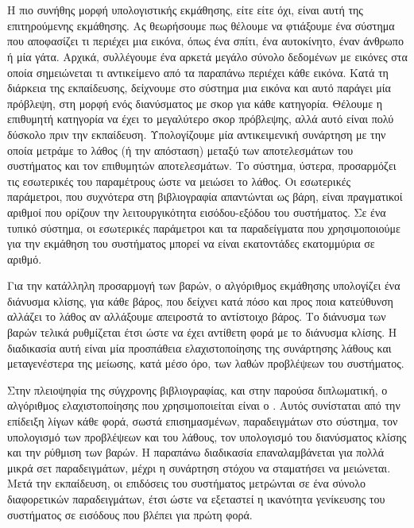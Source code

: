 \section{}

Η πιο συνήθης μορφή υπολογιστικής εκμάθησης, είτε  είτε όχι, είναι αυτή της επιτηρούμενης εκμάθησης. Ας θεωρήσουμε πως θέλουμε να φτιάξουμε ένα σύστημα που αποφασίζει τι περιέχει μια εικόνα, όπως ένα σπίτι, ένα αυτοκίνητο, έναν άνθρωπο ή μία γάτα. Αρχικά, συλλέγουμε ένα αρκετά μεγάλο σύνολο δεδομένων με εικόνες στα οποία σημειώνεται τι αντικείμενο από τα παραπάνω περιέχει κάθε εικόνα. Κατά τη διάρκεια της εκπαίδευσης, δείχνουμε στο σύστημα μια εικόνα και αυτό παράγει μία πρόβλεψη, στη μορφή ενός διανύσματος με σκορ για κάθε κατηγορία. Θέλουμε η επιθυμητή κατηγορία να έχει το μεγαλύτερο σκορ πρόβλεψης, αλλά αυτό είναι πολύ δύσκολο πριν την εκπαίδευση. Υπολογίζουμε μία αντικειμενική συνάρτηση με την οποία μετράμε το λάθος (ή την απόσταση) μεταξύ των αποτελεσμάτων του συστήματος και τον επιθυμητών αποτελεσμάτων. Το σύστημα, ύστερα, προσαρμόζει τις εσωτερικές του παραμέτρους ώστε να μειώσει το λάθος. Οι εσωτερικές παράμετροι, που συχνότερα στη βιβλιογραφία απαντώνται ως βάρη, είναι πραγματικοί αριθμοί που ορίζουν την λειτουργικότητα εισόδου-εξόδου του συστήματος. Σε ένα τυπικό  σύστημα, οι εσωτερικές παράμετροι και τα παραδείγματα που χρησιμοποιούμε για την εκμάθηση του συστήματος μπορεί να είναι εκατοντάδες εκατομμύρια σε αριθμό. 

Για την κατάλληλη προσαρμογή των βαρών, ο αλγόριθμος εκμάθησης υπολογίζει ένα διάνυσμα κλίσης, για κάθε βάρος, που δείχνει κατά πόσο και προς ποια κατεύθυνση αλλάζει το λάθος αν αλλάξουμε απειροστά το αντίστοιχο βάρος. Το διάνυσμα των βαρών τελικά ρυθμίζεται έτσι ώστε να έχει αντίθετη φορά με το διάνυσμα κλίσης. Η διαδικασία αυτή είναι μία προσπάθεια ελαχιστοποίησης της συνάρτησης λάθους και μεταγενέστερα της μείωσης, κατά μέσο όρο, των λαθών προβλέψεων του συστήματος.

Στην πλειοψηφία της σύγχρονης βιβλιογραφίας, και στην παρούσα διπλωματική, ο αλγόριθμος ελαχιστοποίησης που χρησιμοποιείται είναι ο . Αυτός συνίσταται από την επίδειξη λίγων κάθε φορά, σωστά επισημασμένων, παραδειγμάτων στο σύστημα, τον υπολογισμό των προβλέψεων και του λάθους, τον υπολογισμό του διανύσματος κλίσης και την ρύθμιση των βαρών. Η παραπάνω διαδικασία επαναλαμβάνεται για πολλά μικρά σετ παραδειγμάτων, μέχρι η συνάρτηση στόχου να σταματήσει να μειώνεται. Μετά την εκπαίδευση, οι επιδόσεις του συστήματος μετρώνται σε ένα σύνολο διαφορετικών παραδειγμάτων, έτσι ώστε να εξεταστεί η ικανότητα γενίκευσης του συστήματος σε εισόδους που βλέπει για πρώτη φορά.
 
